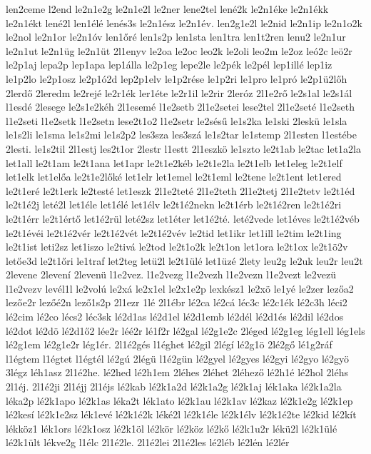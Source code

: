 {len2ceme
l2end
le2n1e2g
le2n1e2l
le2ner
lene2tel
lené2k
le2n1éke
le2n1ékk
le2n1ékt
lené2l
len1élé
lenés3s
le2n1ész
le2n1év.
len2g1e2l
le2nid
le2n1ip
le2n1o2k
le2nol
le2n1or
le2n1óv
len1őré
len1s2p
len1sta
len1tra
len1t2ren
lenu2
le2n1ur
le2n1ut
le2n1üg
le2n1üt
2l1enyv
le2oa
le2oc
leo2k
le2oli
leo2m
le2oz
leó2c
leö2r
le2p1aj
lepa2p
lep1apa
lep1álla
le2p1eg
lepe2le
le2pék
le2pél
lep1illé
lep1iz
le1p2lo
le2p1osz
le2p1ó2d
lep2p1elv
le1p2rése
le1p2ri
le1pro
le1pró
le2p1ü2lőh
2lerdő
2leredm
le2rejé
le2r1ék
ler1éte
le2r1il
le2rir
2leróz
2l1e2rő
le2s1al
le2s1ál
l1esdé
2lesege
le2s1e2kéh
2l1esemé
l1e2setb
2l1e2setei
lese2tel
2l1e2seté
l1e2seth
l1e2seti
l1e2setk
l1e2setn
lese2t1o2
l1e2setr
le2sésű
le1s2ka
le1ski
2leskü
le1sla
le1s2li
le1sma
le1s2mi
le1s2p2
les3sza
les3szá
le1s2tar
le1stemp
2l1esten
l1estébe
2lesti.
le1s2til
2l1estj
les2t1or
2lestr
l1estt
2l1eszkö
le1szto
le2t1ab
le2tac
let1a2la
let1all
le2t1am
le2t1ana
let1apr
le2t1e2kéb
le2t1e2la
le2t1elb
let1eleg
le2t1elf
let1elk
let1előa
le2t1e2lőké
let1elr
let1emel
le2t1eml
le2tene
le2t1ent
let1ered
le2t1eré
le2t1erk
le2testé
let1eszk
2l1e2teté
2l1e2teth
2l1e2tetj
2l1e2tetv
le2t1éd
le2t1é2j
leté2l
let1éle
let1élé
let1élv
le2t1é2nekn
le2t1érb
le2t1é2ren
le2t1é2ri
le2t1érr
le2t1értő
let1é2rül
leté2sz
let1éter
let1é2té.
leté2vede
let1éves
le2t1é2véb
le2t1évéi
le2t1é2vér
le2t1é2vét
le2t1é2vév
le2tid
let1ikr
let1ill
le2tim
le2t1ing
le2t1ist
leti2sz
let1iszo
le2tivá
le2tod
le2t1o2k
le2t1on
let1ora
le2t1ox
le2t1ö2v
letőe3d
le2t1őri
le1traf
let2teg
letü2l
le2t1ülé
let1üzé
2lety
leu2g
le2uk
leu2r
leu2t
2levene
2levení
2levenü
l1e2vez.
l1e2vezg
l1e2vezh
l1e2vezn
l1e2vezt
le2vezü
l1e2vezv
levél1l
le2volú
le2xá
le2x1el
le2x1e2p
lexkész1
le2xö
le1yé
le2zer
lezőa2
lezőe2r
lezőé2n
lező1s2p
2l1ezr
1lé
2l1ébr
lé2ca
lé2cá
léc3c
lé2c1ék
lé2c3h
léci2
lé2cim
lé2co
lécs2
léc3sk
lé2d1as
lé2d1el
lé2d1emb
lé2dél
lé2d1és
lé2dil
lé2dos
lé2dot
lé2dö
lé2d1ő2
lée2r
léé2r
lé1f2r
lé2gal
lé2g1e2c
2léged
lé2g1eg
lég1ell
lég1els
lé2g1em
lé2g1e2r
lég1ér.
2l1é2gés
l1éghet
lé2gil
2légí
lé2g1ö
2lé2gő
lé1g2ráf
l1égtem
l1égtet
l1égtél
lé2gú
2légü
l1é2gün
lé2gyel
lé2gyes
lé2gyi
lé2gyo
lé2gyö
3légz
léh1asz
2l1é2he.
lé2hed
lé2h1em
2léhes
2léhet
2léhező
lé2h1é
lé2hol
2léhs
2l1éj.
2l1é2ji
2l1éjj
2l1éjs
lé2kab
lé2k1a2d
lé2k1a2g
lé2k1aj
lék1aka
lé2k1a2la
léka2p
lé2k1apo
lé2k1as
léka2t
lék1ato
lé2k1au
lé2k1av
lé2kaz
lé2k1e2g
lé2k1ep
lé2kesí
lé2k1e2sz
lék1evé
lé2k1é2k
léké2l
lé2k1éle
lé2k1élv
lé2k1é2te
lé2kid
lé2kít
lékköz1
lék1ors
lé2k1osz
lé2k1öl
lé2kör
lé2köz
lé2kő
lé2k1u2r
lékü2l
lé2k1ülé
lé2k1ült
lékve2g
l1élc
2l1é2le.
2l1é2lei
2l1é2les
lé2léb
lé2lén
lé2lér
}
